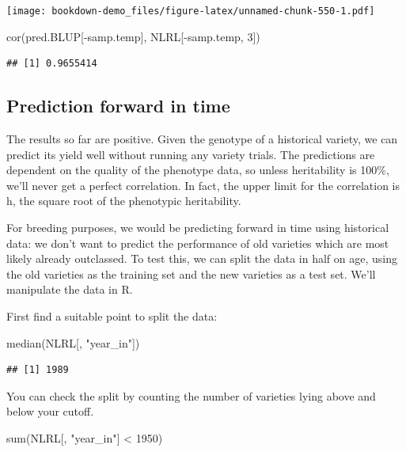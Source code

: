 \documentclass[
]{book}
\newenvironment{Shaded}{\begin{snugshade}}{\end{snugshade}}
\newcommand{\DecValTok}[1]{\textcolor[rgb]{0.00,0.00,0.81}{#1}}
\newcommand{\FunctionTok}[1]{\textcolor[rgb]{0.00,0.00,0.00}{#1}}
\newcommand{\NormalTok}[1]{#1}
\newcommand{\SpecialCharTok}[1]{\textcolor[rgb]{0.00,0.00,0.00}{#1}}
\newcommand{\StringTok}[1]{\textcolor[rgb]{0.31,0.60,0.02}{#1}}
\begin{document}
\texttt{[image: bookdown-demo\_files/figure-latex/unnamed-chunk-550-1.pdf]}

\begin{Shaded}
\begin{Highlighting}[]
\FunctionTok{cor}\NormalTok{(pred.BLUP[}\SpecialCharTok{{-}}\NormalTok{samp.temp], NLRL[}\SpecialCharTok{{-}}\NormalTok{samp.temp, }\DecValTok{3}\NormalTok{])}
\end{Highlighting}
\end{Shaded}

\begin{verbatim}
## [1] 0.9655414
\end{verbatim}

\hypertarget{prediction-forward-in-time}{%
\subsection{Prediction forward in time}\label{prediction-forward-in-time}}

The results so far are positive. Given the genotype of a historical variety, we can predict its yield well without running any variety trials. The predictions are dependent on the quality of the phenotype data, so unless heritability is 100\%, we'll never get a perfect correlation. In fact, the upper limit for the correlation is h, the square root of the phenotypic heritability.

For breeding purposes, we would be predicting forward in time using historical data: we
don't want to predict the performance of old varieties which are most likely already
outclassed. To test this, we can split the data in half on age, using the old varieties as the training set and the new varieties as a test set. We'll manipulate the data in R.

First find a suitable point to split the data:

\begin{Shaded}
\begin{Highlighting}[]
\FunctionTok{median}\NormalTok{(NLRL[, }\StringTok{"year\_in"}\NormalTok{])}
\end{Highlighting}
\end{Shaded}

\begin{verbatim}
## [1] 1989
\end{verbatim}

You can check the split by counting the number of varieties lying above and below your cutoff.

\begin{Shaded}
\begin{Highlighting}[]
\FunctionTok{sum}\NormalTok{(NLRL[, }\StringTok{"year\_in"}\NormalTok{] }\SpecialCharTok{\textless{}} \DecValTok{1950}\NormalTok{)}
\end{Highlighting}
\end{Shaded}
\end{document}
